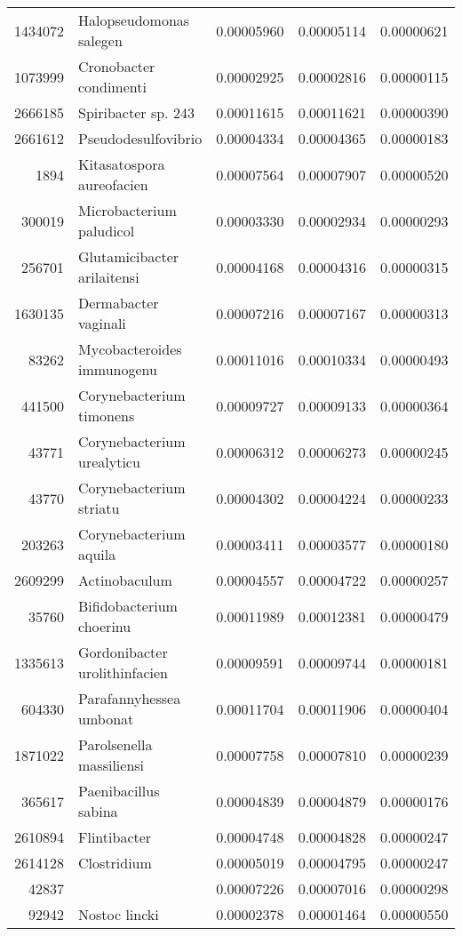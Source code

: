 \begin{table}[ht]
\begin{tabular}{rlrrr}
  1434072 & Halopseudomonas salegen & 0.00005960 & 0.00005114 & 0.00000621 \\ 
  1073999 & Cronobacter condimenti & 0.00002925 & 0.00002816 & 0.00000115 \\ 
  2666185 & Spiribacter sp. 243 & 0.00011615 & 0.00011621 & 0.00000390 \\ 
  2661612 & Pseudodesulfovibrio & 0.00004334 & 0.00004365 & 0.00000183 \\ 
  1894 & Kitasatospora aureofacien & 0.00007564 & 0.00007907 & 0.00000520 \\ 
  300019 & Microbacterium paludicol & 0.00003330 & 0.00002934 & 0.00000293 \\ 
  256701 & Glutamicibacter arilaitensi & 0.00004168 & 0.00004316 & 0.00000315 \\ 
  1630135 & Dermabacter vaginali & 0.00007216 & 0.00007167 & 0.00000313 \\ 
  83262 & Mycobacteroides immunogenu & 0.00011016 & 0.00010334 & 0.00000493 \\ 
  441500 & Corynebacterium timonens & 0.00009727 & 0.00009133 & 0.00000364 \\ 
  43771 & Corynebacterium urealyticu & 0.00006312 & 0.00006273 & 0.00000245 \\ 
  43770 & Corynebacterium striatu & 0.00004302 & 0.00004224 & 0.00000233 \\ 
  203263 & Corynebacterium aquila & 0.00003411 & 0.00003577 & 0.00000180 \\ 
  2609299 & Actinobaculum & 0.00004557 & 0.00004722 & 0.00000257 \\ 
  35760 & Bifidobacterium choerinu & 0.00011989 & 0.00012381 & 0.00000479 \\ 
  1335613 & Gordonibacter urolithinfacien & 0.00009591 & 0.00009744 & 0.00000181 \\ 
  604330 & Parafannyhessea umbonat & 0.00011704 & 0.00011906 & 0.00000404 \\ 
  1871022 & Parolsenella massiliensi & 0.00007758 & 0.00007810 & 0.00000239 \\ 
  365617 & Paenibacillus sabina & 0.00004839 & 0.00004879 & 0.00000176 \\ 
  2610894 & Flintibacter & 0.00004748 & 0.00004828 & 0.00000247 \\ 
  2614128 & Clostridium & 0.00005019 & 0.00004795 & 0.00000247 \\ 
  42837 &   & 0.00007226 & 0.00007016 & 0.00000298 \\ 
  92942 & Nostoc lincki & 0.00002378 & 0.00001464 & 0.00000550 \\ 

\end{tabular}
\end{table}
